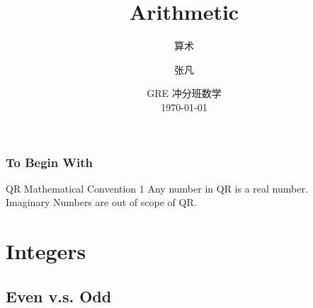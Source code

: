 \documentclass[
	11pt, %
]{beamer}
\title[Arithmetic]{Arithmetic} %
\subtitle{算术} %
\author[张凡]{张凡} %
\institute[XDF]{新东方国际教育 \\ \smallskip \textit{zhangfan@xdf.cn}} %
\date[\today]{GRE 冲分班数学 \\ \today} %
\begin{document}

\begin{frame}
	\titlepage %
\end{frame}




\begin{frame}
	\frametitle{To Begin With}
	\begin{block}{QR Mathematical Convention 1 }
		Any number in QR is a real number. \\ Imaginary Numbers are \alert{out of scope of} QR.
	\end{block}
\end{frame}



\section{Integers}

\subsection{Even v.s. Odd}
\end{document}
